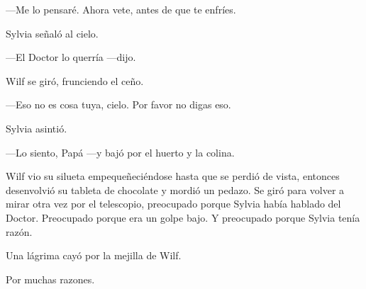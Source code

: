 ---Me lo pensaré. Ahora vete, antes de que te enfríes.

Sylvia señaló al cielo.

---El Doctor lo querría ---dijo.

Wilf se giró, frunciendo el ceño.

---Eso no es cosa tuya, cielo. Por favor no digas eso.

Sylvia asintió.

---Lo siento, Papá ---y bajó por el huerto y la colina.

Wilf vio su silueta empequeñeciéndose hasta que se perdió de vista,
entonces desenvolvió su tableta de chocolate y mordió un pedazo. Se giró
para volver a mirar otra vez por el telescopio, preocupado porque Sylvia
había hablado del Doctor. Preocupado porque era un golpe bajo. Y
preocupado porque Sylvia tenía razón.

Una lágrima cayó por la mejilla de Wilf.

Por muchas razones.
